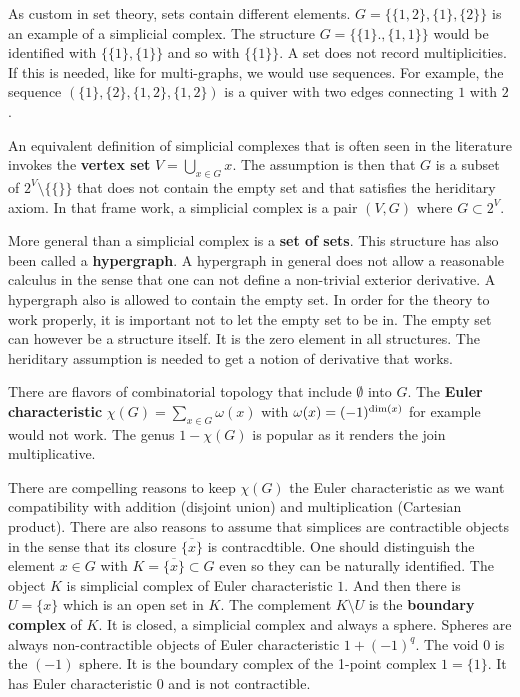 \documentclass[12pt]{amsart}
\begin{document}
\vspace{3mm}
As custom in set theory, sets contain different elements. 
$G=\{ \{1,2\},\{1\},\{2\} \}$ is an example of a simplicial 
complex. The structure $G=\{ \{1\}.,\{1,1\} \}$ would be identified with 
$\{ \{1\},\{1\} \}$ and so with $\{ \{1\} \}$.
A set does not record multiplicities. If this is needed, like for multi-graphs, we would
use sequences. For example, the sequence $( \{1\},\{2\},\{1,2\},\{1,2\} )$ is a quiver
with two edges connecting $1$ with $2$. 

\vspace{3mm}
An equivalent definition of simplicial complexes that is often
seen in the literature invokes the
{\bf vertex set} $V=\bigcup_{x \in G} x$. The assumption is then that
$G$ is a subset of $2^V \setminus \{ \{\} \}$ that does not contain the empty set
and that satisfies the heriditary axiom. In that frame work, a simplicial complex
is a pair $(V,G)$ where $G \subset 2^V$. 

\vspace{3mm}
More general than a simplicial complex is a {\bf set of sets}. This structure has also been
called a {\bf hypergraph}. A hypergraph in general does not allow a reasonable calculus in 
the sense that one can not define a non-trivial exterior derivative.
A hypergraph also is allowed to contain the empty set. 
In order for the theory to work properly, it is important not to let the empty set to 
be in. The empty set can however be a structure itself. It is the zero element in all 
structures. The heriditary assumption is needed to get a notion of derivative that works. 

\vspace{3mm}
There are flavors of combinatorial topology that include $\emptyset$ into $G$.  
The {\bf Euler characteristic} $\chi(G) = \sum_{x \in G} \omega(x)$ with 
$\omega(x)=(-1)^{{\rm dim}(x)}$ for example would not work. 
The genus $1-\chi(G)$ is popular as it renders the join multiplicative.

\vspace{3mm}
There are compelling reasons to keep $\chi(G)$ the Euler characteristic as we want compatibility
with addition (disjoint union) and multiplication (Cartesian product). There are also 
reasons to assume that simplices are contractible objects in the sense that its closure $\overline{\{x\}}$ 
is contracdtible. One should distinguish the element $x \in G$ with $K=\overline{\{x\}} \subset G$ even so they
can be naturally identified.  The object $K$ is simplicial complex of Euler characteristic $1$. 
And then there is $U=\{ x\}$ which is an open set in $K$. The complement $K \setminus U$ is the 
{\bf boundary complex} of $K$.
It is closed, a simplicial complex and always a sphere. 
Spheres are always non-contractible objects of Euler characteristic $1+(-1)^q$. 
The void $0$ is the $(-1)$ sphere. It is the boundary complex of the 1-point complex $1=\{ 1\}$.
It has Euler characteristic $0$ and is not contractible. 
\end{document}
